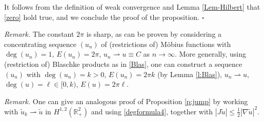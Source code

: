 \documentclass[12pt, a4paper]{article}
\newenvironment{rmk}{\medskip\noindent\emph{Remark.}}{\medskip}
\newcommand{\sph}{\mathbb{S}}
\newcommand{\vp}{\varphi}
\newcommand{\R}{\mathbb{R}}
\newcommand{\ve}{\varepsilon}
\renewcommand{\(}{\left(}
\renewcommand{\)}{\right)}
\begin{document}
It follows from the definition of weak convergence and Lemma \ref{Lem-Hilbert} that \eqref{zero} hold true, and we conclude the proof of the proposition. %
 \hfill $\square$


\begin{rmk}
The constant $2\pi$ is sharp, as can be proven by considering a concentrating sequence $(u_n)$ of  (restrictions of) M\"obius functions with $\deg (u_n)=1$, $E(u_n)=2\pi$, $u_n\rightharpoonup u\equiv C$ as $n\to\infty$. More generally, using (restriction of) Blaschke products as in \eqref{Blas}, one can construct a sequence $(u_n)$ with $\deg(u_n)=k>0$, $E(u_n)=2\pi k$ (by Lemma \ref{l:Blas}), $u_n\rightharpoonup u$, $\deg(u)=\ell\in [0,k)$, $E(u)=2\pi \ell$.
\end{rmk}

\begin{rmk}
One can give an analogous proof of Proposition \ref{p:jump} by working with $\tilde u_k\rightharpoonup \tilde u$ in $H^{1,2}(\R^2_+)$ and using \eqref{degformula4}, together with $|J\tilde u|\le \frac{1}{2}|\nabla \tilde u|^2$.
\end{rmk}
\end{document}

